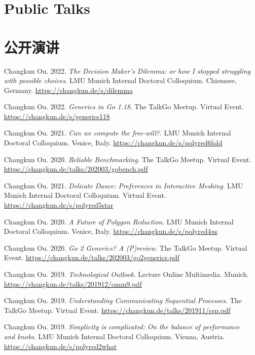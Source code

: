  {
  \section{\textbf{Public Talks}}
}{
  \section{\textbf{公开演讲}}
}
\resumeSubHeadingListStart
\small
    \item{
      Changkun Ou. 2022.
      \emph{The Decision Maker's Dilemma: or how I stopped struggling with possible choices}.
      LMU Munich Internal Doctoral Colloquium. Chiemsee, Germany.
      \url{https://changkun.de/s/dilemma}
    }
    \item{
      Changkun Ou. 2022.
      \emph{Generics in Go 1.18}.
      The TalkGo Meetup. Virtual Event.
      \url{https://changkun.de/s/generics118}
    }
    \item{
      Changkun Ou. 2021.
      \emph{Can we compute the free-will?}.
      LMU Munich Internal Doctoral Colloquium. Venice, Italy.
      \url{https://changkun.de/s/polyred6fold}
    }
    \item{
      Changkun Ou. 2020.
      \emph{Reliable Benchmarking}.
      The TalkGo Meetup. Virtual Event.
      \url{https://changkun.de/talks/202003/gobench.pdf}
    }
    \item{
      Changkun Ou. 2021.
      \emph{Delicate Dance: Preferences in Interactive Meshing}.
      LMU Munich Internal Doctoral Colloquium. Virtual Event.
      \url{https://changkun.de/s/polyred5star}
    }
    \item{
      Changkun Ou. 2020.
      \emph{A Future of Polygon Reduction}.
      LMU Munich Internal Doctoral Colloquium. Venice, Italy.
      \url{https://changkun.de/s/polyred4us}
    }
    \item{
      Changkun Ou. 2020.
      \emph{Go 2 Generics? A (P)review}.
      The TalkGo Meetup. Virtual Event.
      \url{https://changkun.de/talks/202003/go2generics.pdf}
    }
    \item{
      Changkun Ou. 2019.
      \emph{Technological Outlook}.
      Lecture Online Multimedia. Munich.
      \url{https://changkun.de/talks/201912/omm9.pdf}
    }
    \item{
      Changkun Ou. 2019.
      \emph{Understanding Communicating Sequential Processes}.
      The TalkGo Meetup. Virtual Event.
      \url{https://changkun.de/talks/201911/csp.pdf}
    }
    \item{
      Changkun Ou. 2019.
      \emph{Simplicity is complicated: On the balance of performance and knobs}.
      LMU Munich Internal Doctoral Colloquium. Vienna, Austria.
      \url{https://changkun.de/s/polyred2what}
    }
